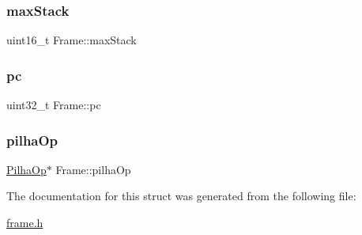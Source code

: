\mbox{\label{structFrame_a378c00e14ef1f63cbbfa4e984502b652}} 
\subsubsection{\texorpdfstring{max\+Stack}{maxStack}}
{\footnotesize\ttfamily uint16\+\_\+t Frame\+::max\+Stack}

\mbox{\label{structFrame_a91e50d2091184efb52b6d7c0c21fd4b2}} 
\subsubsection{\texorpdfstring{pc}{pc}}
{\footnotesize\ttfamily uint32\+\_\+t Frame\+::pc}

\mbox{\label{structFrame_addbe682d4328100186a4c03da7c2b9a2}} 
\subsubsection{\texorpdfstring{pilha\+Op}{pilhaOp}}
{\footnotesize\ttfamily \hyperlink{structPilhaOp}{Pilha\+Op}$\ast$ Frame\+::pilha\+Op}



The documentation for this struct was generated from the following file\+:\begin{DoxyCompactItemize}
\item 
\hyperlink{frame_8h}{frame.\+h}\end{DoxyCompactItemize}
